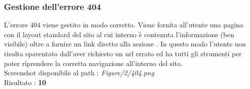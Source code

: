 \subsubsection{Gestione dell'errore 404}
L'errore 404 viene gestito in modo corretto.
Viene fornita all'utente una pagina con il layout standard del sito al cui
interno è contenuta l'informazione  (ben visibile) 
oltre a fornire un link diretto alla sezione 
. In questo modo l'utente non risulta
spaventato dall'aver richiesto un url errato ed ha tutti gli strumenti per poter
riprendere la corretta navigazione all'interno del sito. \\ 
Screenshot disponibile al path : \textit{Figure/2/404.png} \\ 
Risultato : \textbf{10}
